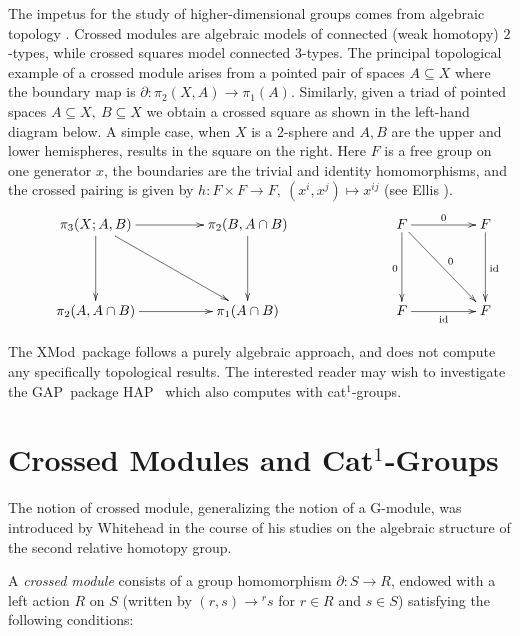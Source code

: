 \documentclass{ws-ijac}
\newcommand{\GAP}      {{\sf GAP}}
\newcommand{\HAP}      {{\sf HAP}}
\newcommand{\XMod}     {{\sf XMod}}
\begin{document}
The impetus for the study of higher-dimensional groups 
comes from algebraic topology \cite{brown-indag}. 
Crossed modules are algebraic models of connected (weak homotopy) $2$-types, 
while crossed squares model connected $3$-types. 
The principal topological example of a crossed module arises from 
a pointed pair of spaces $ A \subseteq X$ where the boundary map is 
$\partial : \pi_2(X,A) \to \pi_1(A)$. 
Similarly, given a triad of pointed spaces $A \subseteq X,\ B \subseteq X$ 
we obtain a crossed square as shown in the left-hand diagram below. 
A simple case, when $X$ is a $2$-sphere and $A,B$ are the 
upper and lower hemispheres, results in the square on the right. 
Here $F$ is a free group on one generator $x$, 
the boundaries are the trivial and identity homomorphisms, 
and the crossed pairing is given by 
$h : F \times F \to F,\ (x^i,x^j) \mapsto x^{ij}$  
(see Ellis \cite{ellis}). 
\begin{equation*} 
\xymatrix@R=20pt@C=20pt
{     &  \pi_3(X;A,B) \ar[dd] \ar[rr] \ar[ddrr] 
         &  & \pi_2(B, A \cap B) \ar[dd] 
               &  &  &  F \ar[dd]_{0} \ar[rr]^{0} \ar[ddrr]^{0} 
                        &  &  F \ar[dd]^{{\rm id}} \\
      &  &  &  &  &    \\  
      &  \pi_2(A,A \cap B) \ar[rr] 
         &  & \pi_1(A \cap B) & &  &  F \ar[rr]_{{\rm id}} 
                        &  &  F } 
\end{equation*}

The \XMod\ package follows a purely algebraic approach, 
and does not compute any specifically topological results. 
The interested reader may wish to investigate the \GAP\ package
\HAP\ \cite{hap} which also computes with cat$^1$-groups. 



\section{Crossed Modules and Cat$^{1}$-Groups}

The notion of crossed module, generalizing the notion of a G-module, 
was introduced by Whitehead \cite{whitehead-II} in the course of his studies 
on the algebraic structure of the second relative homotopy group.

A \emph{crossed module} consists of a group homomorphism 
$\partial : S \rightarrow R$, endowed with a left action $R$ on $S$ 
(written by $(r,s) \rightarrow {}^{r}s$ for $r \in R$ and $s \in S$) 
satisfying the following conditions:
\end{document}

